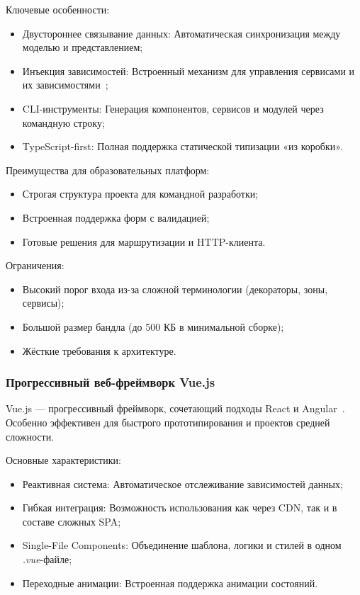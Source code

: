Ключевые особенности:
\begin{itemize}
  \item Двустороннее связывание данных: Автоматическая синхронизация между моделью и представлением;
  \item Инъекция зависимостей: Встроенный механизм для управления сервисами и их зависимостями~\cite{angular_dependency_injection};
  \item CLI-инструменты: Генерация компонентов, сервисов и модулей через командную строку;
  \item TypeScript-first: Полная поддержка статической типизации «из коробки».
\end{itemize}

Преимущества для образовательных платформ:
\begin{itemize}
  \item Строгая структура проекта для командной разработки;
  \item Встроенная поддержка форм с валидацией;
  \item Готовые решения для маршрутизации и HTTP-клиента.
\end{itemize}

Ограничения:
\begin{itemize}
  \item Высокий порог входа из-за сложной терминологии (декораторы, зоны, сервисы);
  \item Большой размер бандла (до 500 КБ в минимальной сборке);
  \item Жёсткие требования к архитектуре.
\end{itemize}

\subsubsection{Прогрессивный веб-фреймворк Vue.js}
Vue.js — прогрессивный фреймворк, сочетающий подходы React и Angular~\cite{vuejs_guide}. Особенно эффективен для быстрого прототипирования и проектов средней сложности.

Основные характеристики:
\begin{itemize}
  \item Реактивная система: Автоматическое отслеживание зависимостей данных;
  \item Гибкая интеграция: Возможность использования как через CDN, так и в составе сложных SPA;
  \item Single-File Components: Объединение шаблона, логики и стилей в одном \textit{.vue}-файле;
  \item Переходные анимации: Встроенная поддержка анимации состояний.
\end{itemize}

